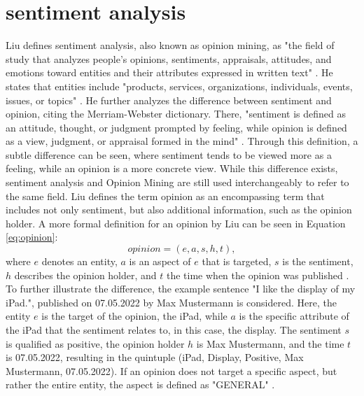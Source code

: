 
\section{sentiment analysis}
Liu defines sentiment analysis, also known as opinion mining, as "the field of study that analyzes people's opinions, sentiments, appraisals, attitudes, and emotions toward entities and their attributes expressed in written text" \cite[p.~1]{liu_2015}. He states that entities include "products, services, organizations, individuals, events, issues, or topics" \cite[p.~1]{liu_2015}. He further analyzes the difference between sentiment and opinion, citing the Merriam-Webster dictionary. There, "sentiment is defined as an attitude, thought, or judgment prompted by feeling, while opinion is defined as a view, judgment, or appraisal formed in the mind" \cite[p.~2]{liu_2015}. Through this definition, a subtle difference can be seen, where sentiment tends to be viewed more as a feeling, while an opinion is a more concrete view. While this difference exists, sentiment analysis and Opinion Mining are still used interchangeably to refer to the same field. Liu defines the term opinion as an encompassing term that includes not only sentiment, but also additional information, such as the opinion holder. A more formal definition for an opinion by Liu can be seen in Equation \eqref{eq:opinion}:
\begin{equation}
    opinion = (e, a, s, h, t),
    \label{eq:opinion}
\end{equation}
where $e$ denotes an entity, $a$ is an aspect of $e$ that is targeted, $s$ is the sentiment, $h$ describes the opinion holder, and $t$ the time when the opinion was published \cite{liu_2015}. To further illustrate the difference, the example sentence "I like the display of my iPad.", published on 07.05.2022 by Max Mustermann is considered. Here, the entity $e$ is the target of the opinion, the iPad, while $a$ is the specific attribute of the iPad that the sentiment relates to, in this case, the display. The sentiment $s$ is qualified as positive, the opinion holder $h$ is Max Mustermann, and the time $t$ is 07.05.2022, resulting in the quintuple (iPad, Display, Positive, Max Mustermann, 07.05.2022). If an opinion does not target a specific aspect, but rather the entire entity, the aspect is defined as "GENERAL" \cite{liu_2015}. 


